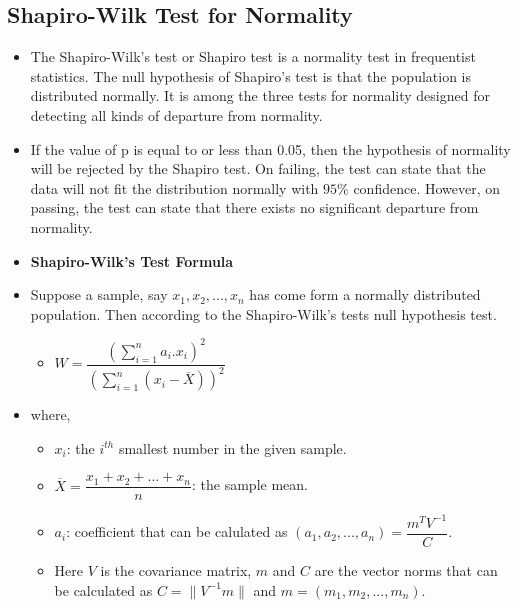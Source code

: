 \documentclass[a4paper]{article}
\begin{document}
\subsection{Shapiro-Wilk Test for Normality}
\begin{itemize}
    
    \item[] The Shapiro-Wilk’s test or Shapiro test is a normality test in frequentist statistics. The null hypothesis of Shapiro’s test is that the population is distributed normally. It is among the three tests for normality designed for detecting all kinds of departure from normality. 
    
    \item[] If the value of p is equal to or less than 0.05, then the hypothesis of normality will be rejected by the Shapiro test. On failing, the test can state that the data will not fit the distribution normally with $95\%$ confidence. However, on passing, the test can state that there exists no significant departure from normality.
    
    \item[] \textbf{Shapiro-Wilk's Test Formula}
    \item[] Suppose a sample, say $x_1, x_2,...,x_n$ has come form a normally distributed population. Then according to the Shapiro-Wilk's tests null hypothesis test.
    \begin{itemize}
        \centering
        \large
        \item[] $W =\dfrac{(\sum_{i=1}^{n} a_i.x_i)^2}{(\sum_{i=1}^{n}(x_i - \overline{X}))^2}$ 
    \end{itemize}
    \item[] where,
    \begin{itemize}
        \item[] $x_i$: the $i^{th}$ smallest number in the given sample.
        \item[] $\overline{X}= \dfrac{x_1+x_2+...+x_n}{n}$: the sample mean.
        \item[] $a_i$: coefficient that can be calulated as $(a_1,a_2,...,a_n)=\dfrac{m^TV^{-1}}{C}$. 
        \item[] Here $V$ is the covariance matrix, $m$ and $C$ are the vector norms that can be calculated as $C=\| V^{-1}m \|$ and $m=(m_1,m_2,...,m_n)$.
    \end{itemize}
\end{itemize}
\end{document}
